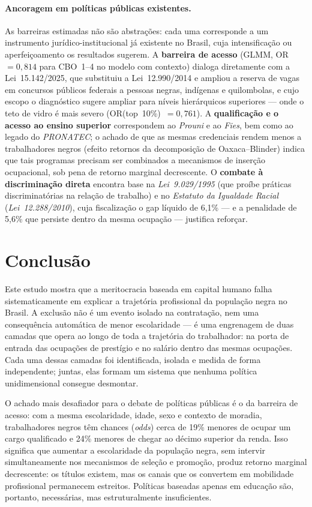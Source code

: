 \documentclass[12pt, a4paper, oneside]{article}
\begin{document}
\paragraph{Ancoragem em políticas públicas existentes.}
As barreiras estimadas não são abstrações: cada uma corresponde a um instrumento
jurídico-institucional já existente no Brasil, cuja intensificação ou
aperfeiçoamento os resultados sugerem.
A \textbf{barreira de acesso} (GLMM, OR~$=0,814$ para CBO~1--4 no modelo com
contexto) dialoga diretamente com a Lei~15.142/2025, que substituiu a Lei~12.990/2014 e ampliou a reserva de vagas em concursos públicos federais a pessoas negras, indígenas e quilombolas, e cujo escopo o
diagnóstico sugere ampliar para níveis hierárquicos superiores --- onde o teto de
vidro é mais severo (OR(top~10\%)~$=0,761$).
A \textbf{qualificação e o acesso ao ensino superior} correspondem ao
\textit{Prouni} e ao \textit{Fies}, bem como ao legado do \textit{PRONATEC}; o
achado de que as mesmas credenciais rendem menos a trabalhadores negros (efeito
retornos da decomposição de Oaxaca--Blinder) indica que tais programas precisam ser
combinados a mecanismos de inserção ocupacional, sob pena de retorno marginal
decrescente.
O \textbf{combate à discriminação direta} encontra base na \textit{Lei~9.029/1995}
(que proíbe práticas discriminatórias na relação de trabalho) e no \textit{Estatuto
da Igualdade Racial} (\textit{Lei~12.288/2010}), cuja fiscalização o gap líquido de
6,1\% --- e a penalidade de 5,6\% que persiste dentro da mesma ocupação ---
justifica reforçar.

\section{Conclusão}
\label{sec:conclusao}

Este estudo mostra que a meritocracia baseada em capital humano falha
sistematicamente em explicar a trajetória profissional da população negra no
Brasil. A exclusão não é um evento isolado na contratação, nem uma consequência
automática de menor escolaridade --- é uma engrenagem de duas camadas que opera ao
longo de toda a trajetória do trabalhador: na porta de entrada das ocupações de
prestígio e no salário dentro das mesmas ocupações.
Cada uma dessas camadas foi identificada, isolada e medida de forma independente;
juntas, elas formam um sistema que nenhuma política unidimensional consegue desmontar.

O achado mais desafiador para o debate de políticas públicas é o da barreira de
acesso: com a mesma escolaridade, idade, sexo e contexto de moradia, trabalhadores
negros têm chances (\emph{odds}) cerca de 19\% menores de ocupar um cargo qualificado e
24\% menores de chegar ao décimo superior da renda. Isso significa que aumentar a
escolaridade da população negra, sem intervir simultaneamente nos mecanismos de
seleção e promoção, produz retorno marginal decrescente: os títulos existem, mas
os canais que os convertem em mobilidade profissional permanecem estreitos.
Políticas baseadas apenas em educação são, portanto, necessárias, mas
estruturalmente insuficientes.
\end{document}
